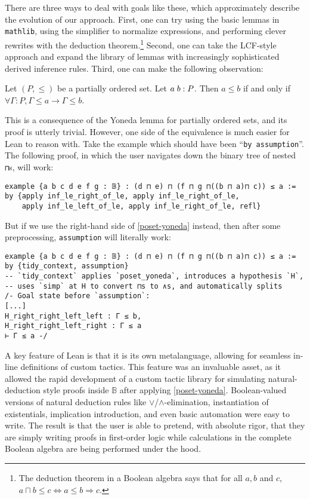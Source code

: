 \documentclass[a4paper,USenglish,cleveref, autoref]{lipics-v2019}
\newcommand{\B}{\mathbb{B}}
\newcommand{\lil}{\lstinline}
\theoremstyle{theorem}
\theoremstyle{definition}
\begin{document}
There are three ways to deal with goals like these, which approximately describe the evolution of our approach. First, one can try using the basic lemmas in \lil{mathlib}, using the simplifier to normalize expressions, and performing clever rewrites with the deduction theorem.\footnote{The deduction theorem in a Boolean algebra says that for all $a, b$ and $c$, $a \sqcap b \leq c \iff a \leq b \Rightarrow c$.} Second, one can take the LCF-style approach and expand the library of lemmas with increasingly sophisticated derived inference rules. Third, one can make the following observation:

\begin{lemma}\label{poset-yoneda}
  Let $(P, \leq)$ be a partially ordered set. Let $a \hspace{1mm} b : P$. Then $a \leq b$ if and only if $\forall \Gamma : P, \Gamma \leq a \to \Gamma \leq b$.
\end{lemma}
This is a consequence of the Yoneda lemma for partially ordered sets, and its proof is utterly trivial. However, one side of the equivalence is much easier for Lean to reason with. Take the example which should have been ``\lil{by assumption}''. The following proof, in which the user navigates down the binary tree of nested \lil{⊓}s, will work:
\begin{lstlisting}
example {a b c d e f g : 𝔹} : (d ⊓ e) ⊓ (f ⊓ g ⊓((b ⊓ a)⊓ c)) ≤ a :=
by {apply inf_le_right_of_le, apply inf_le_right_of_le,
    apply inf_le_left_of_le, apply inf_le_right_of_le, refl}
\end{lstlisting}

But if we use the right-hand side of \autoref{poset-yoneda} instead, then after some preprocessing, \lstinline{assumption} will literally work:

\begin{lstlisting}
example {a b c d e f g : 𝔹} : (d ⊓ e) ⊓ (f ⊓ g ⊓((b ⊓ a)⊓ c)) ≤ a :=
by {tidy_context, assumption}
-- `tidy_context` applies `poset_yoneda`, introduces a hypothesis `H`,
-- uses `simp` at H to convert ⊓s to ∧s, and automatically splits
/- Goal state before `assumption`:
[...]
H_right_right_left_left : Γ ≤ b,
H_right_right_left_right : Γ ≤ a
⊢ Γ ≤ a -/
\end{lstlisting}

A key feature of Lean is that it is its own metalanguage, allowing for seamless in-line definitions of custom tactics. This feature was an invaluable asset, as it allowed the rapid development of a custom tactic library for simulating natural-deduction style proofs inside $\B$ after applying \autoref{poset-yoneda}. Boolean-valued versions of natural deduction rules like $\lor$/$\land$-elimination, instantiation of existentials, implication introduction, and even basic automation were easy to write. The result is that the user is able to pretend, with absolute rigor, that they are simply writing proofs in first-order logic while calculations in the complete Boolean algebra are being performed under the hood.
\end{document}
